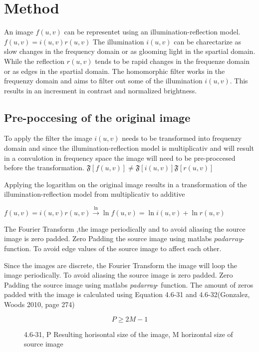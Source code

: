 \section{Method}

An image $f(u,v)$ can be representet using an illumination-reflection model. $f(u,v) = i(u,v) r(u,v)$
The illumination $i(u,v)$ can be charectarize as slow changes in the frequency domain or as glooming light in the spartial domain. While the reflection $r(u,v)$ tends to be rapid changes in the frequenze domain or as edges in the spartial domain. The homomorphic filter works in the frequenzy domain and aims to filter out some of the illumination $i(u,v)$. This results in an incresment in contrast and normalized brightness. \\

\subsection{Pre-poccesing of the original image}
To apply the filter the image $i(u,v)$ needs to be transformed into frequenzy domain and since the illumination-reflection model is multiplicativ and will result in a convulotion in frequency space the image will need to be pre-proccesed before the transformation.
$\mathfrak{F}[f(u,v)] \neq \mathfrak{F}[i(u,v)] \mathfrak{F}[r(u,v)] $

Applying the logarithm on the original image results in a transformation of the illumination-reflection model from multiplicativ to additive

$ f(u,v) = i(u,v) r(u,v) \xrightarrow{\ln} \ln{f(u,v)} = \ln{i(u,v)} + \ln{r(u,v)} $

The Fourier Transform ,the image periodically and to avoid aliasing the source image is zero padded. Zero Padding the source image using matlabs $padarray$- function. To avoid edge values of the source image to affect each other.

Since the images are discrete, the Fourier Transform the image will loop the image periodically. To avoid aliasing the source image is zero padded. Zero Padding the source image using matlabs \textit{padarray}- function. The amount of zeros padded with the image is calculated using Equation 4.6-31 and 4.6-32(Gonzalez, Woods 2010, page 274) 
\begin{figure}
\begin{equation}
  P \geq 2M -1
  \label{eqn:Ppadded}
\end{equation}
\caption{4.6-31, P Resulting horisontal size of the image, M horizontal size of source image}
\end{figure}

